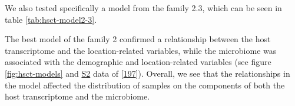 \documentclass[
  12pt,
  a4paper,
  twoside,
  openright]{book}
\begin{document}
We also tested specifically a model from the family 2.3, which can be seen in table \ref{tab:hsct-model2-3}.

\begin{table}[H]

\caption[Model 2.3 of the HSCT dataset.]{\label{tab:hsct-model2-3}Relationships between the different blocks in the HSCT dataset for model 2.3. 0 indicates no relationship and 1 indicates a strong relationship.}
\centering
{}
\end{table}

The best model of the family 2 confirmed a relationship between the host transcriptome and the location-related variables, while the microbiome was associated with the demographic and location-related variables (see figure \ref{fig:hsct-models} and \href{https://journals.plos.org/plosone/article?id=10.1371/journal.pone.0246367\#pone.0246367.s002}{S2} data of {[}\protect\hyperlink{ref-revilla2021}{197}{]}).
Overall, we see that the relationships in the model affected the distribution of samples on the components of both the host transcriptome and the microbiome.
\end{document}
